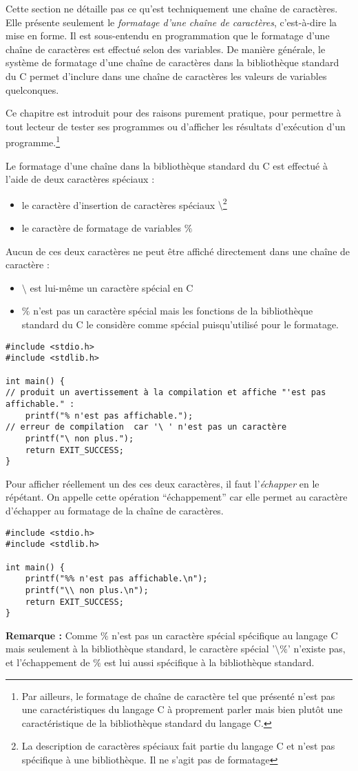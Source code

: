 \documentclass[../../../main.tex]{subfiles}
\begin{document}
Cette section ne détaille pas ce qu'est techniquement une chaîne de caractères. Elle présente seulement le \textit{formatage d'une chaîne de caractères}, c'est-à-dire la mise en forme. Il est sous-entendu en programmation que le formatage d'une chaîne de caractères est effectué selon des variables. De manière générale, le système de formatage d'une chaîne de caractères dans la bibliothèque standard du C permet d'inclure dans une chaîne de caractères les valeurs de variables quelconques.
 
Ce chapitre est introduit pour des raisons purement pratique, pour permettre à tout lecteur de tester ses programmes ou d'afficher les résultats d'exécution d'un programme.\footnote{Par ailleurs, le formatage de chaîne de caractère tel que présenté n'est pas une caractéristiques du langage C à proprement parler mais bien plutôt une caractéristique de la bibliothèque standard du langage C.}

Le formatage d'une chaîne dans la bibliothèque standard du C est effectué à l'aide de deux caractères spéciaux :
\begin{itemize}
	\item le caractère d'insertion de caractères spéciaux $\setminus$\footnote{La description de caractères spéciaux fait partie du langage C et n'est pas spécifique à une bibliothèque. Il ne s'agit pas de formatage}
	\item le caractère de formatage de variables $\%$
\end{itemize}
Aucun de ces deux caractères ne peut être affiché directement dans une chaîne de caractère :
\begin{itemize}
	\item $\setminus$ est lui-même un caractère spécial en C
	\item $\%$ n'est pas un caractère spécial mais les fonctions de la bibliothèque standard du C le considère comme spécial puisqu'utilisé pour le formatage.
\end{itemize}
\begin{verbatim}
#include <stdio.h>
#include <stdlib.h>

int main() {
// produit un avertissement à la compilation et affiche "'est pas affichable." :
	printf("% n'est pas affichable."); 
// erreur de compilation  car '\ ' n'est pas un caractère
	printf("\ non plus.");
	return EXIT_SUCCESS;
}
\end{verbatim}
Pour afficher réellement un des ces deux caractères, il faut l'\textit{échapper} en le répétant. On appelle cette opération ``échappement'' car elle permet au caractère d'échapper au formatage de la chaîne de caractères.
\begin{verbatim}
#include <stdio.h>
#include <stdlib.h>

int main() {
	printf("%% n'est pas affichable.\n");
	printf("\\ non plus.\n");
	return EXIT_SUCCESS;
}
\end{verbatim}
\textbf{Remarque :} Comme $\%$ n'est pas un caractère spécial spécifique au langage C mais seulement à la bibliothèque standard, le caractère spécial '$\setminus \%$' n'existe pas, et l'échappement de $\%$ est lui aussi spécifique à la bibliothèque standard.
\end{document}
